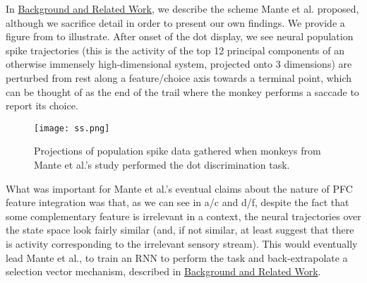 \documentclass[12pt,a4paper,final]{iopart}
\begin{document}
In \hyperref[sec:back]{Background and Related Work}, we describe the scheme Mante et al. proposed, although we sacrifice detail in order to present our own findings. We provide a figure from \cite{Mante2013} to illustrate. After onset of the dot display, we see neural population spike trajectories (this is the activity of the top 12 principal components of an otherwise immensely high-dimensional system, projected onto 3 dimensions) are perturbed from rest along a feature/choice axis towards a terminal point, which can be thought of as the end of the trail where the monkey performs a saccade to report its choice.

\begin{figure}[h!]
  \centering
  \texttt{[image: ss.png]}
  \caption{Projections of population spike data gathered when monkeys from Mante et al.'s study performed the dot discrimination task.}
\end{figure}

What was important for Mante et al.'s eventual claims about the nature of PFC feature integration was that, as we can see in a/c and d/f, despite the fact that some complementary feature is irrelevant in a context, the neural trajectories over the state space look fairly similar (and, if not similar, at least suggest that there is activity corresponding to the irrelevant sensory stream). This would eventually lead Mante et al., to train an RNN to perform the task and back-extrapolate a selection vector mechanism, described in \hyperref[sec:back]{Background and Related Work}. 

\end{document}
